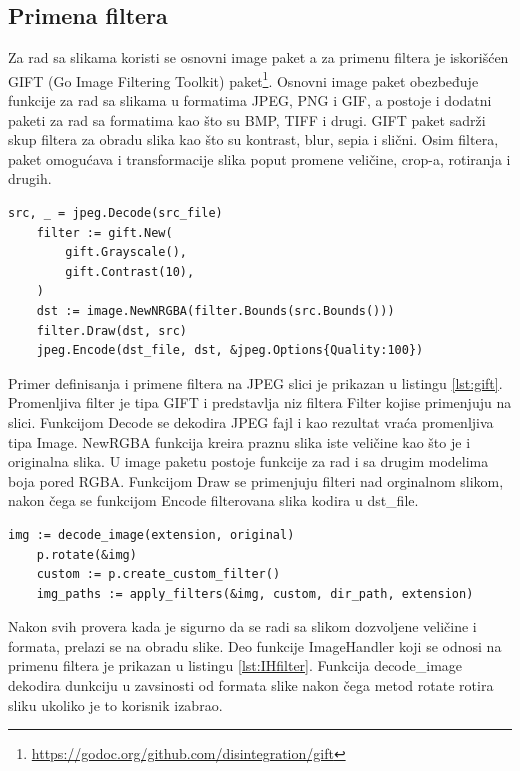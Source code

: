 \documentclass[12pt,oneside]{memoir}
\begin{document}
\subsection{Primena filtera}

Za rad sa slikama koristi se osnovni image paket a za primenu filtera je iskorišćen GIFT (Go Image Filtering Toolkit) paket\footnote{\url{https://godoc.org/github.com/disintegration/gift}}. Osnovni image paket obezbeđuje funkcije za rad sa slikama u formatima JPEG, PNG i GIF, a postoje i dodatni paketi za rad sa formatima kao što su BMP, TIFF i drugi. GIFT paket sadrži skup filtera za obradu slika kao što su kontrast, blur, sepia i slični. Osim filtera, paket omogućava i transformacije slika poput promene veličine, crop-a, rotiranja i drugih.

\begin{center}
\begin{lstlisting}[caption=Definisanje i primena filtera,label={lst:gift},  backgroundcolor=\color{background}]
	src, _ = jpeg.Decode(src_file)
	filter := gift.New(
		gift.Grayscale(),
		gift.Contrast(10),
	)
	dst := image.NewNRGBA(filter.Bounds(src.Bounds()))
	filter.Draw(dst, src)
	jpeg.Encode(dst_file, dst, &jpeg.Options{Quality:100})
\end{lstlisting}
\end{center}

Primer definisanja i primene filtera na JPEG slici je prikazan u listingu \ref{lst:gift}. Promenljiva filter je tipa GIFT i predstavlja niz filtera Filter kojise primenjuju na slici. Funkcijom Decode se dekodira JPEG fajl i kao rezultat vraća promenljiva tipa Image. NewRGBA funkcija kreira praznu slika iste veličine kao što je i originalna slika. U image paketu postoje funkcije za rad i sa drugim modelima boja pored RGBA. Funkcijom Draw se primenjuju filteri nad orginalnom slikom, nakon čega se funkcijom Encode filterovana slika kodira u dst\_file.

\begin{center}
\begin{lstlisting}[caption=Primena filtera u funkciji ImageHandler,label={lst:IHfilter},  backgroundcolor=\color{background}]
	img := decode_image(extension, original)
	p.rotate(&img)
	custom := p.create_custom_filter()
	img_paths := apply_filters(&img, custom, dir_path, extension)
\end{lstlisting}
\end{center}

Nakon svih provera kada je sigurno da se radi sa slikom dozvoljene veličine i formata, prelazi se na obradu slike. Deo funkcije ImageHandler koji se odnosi na primenu filtera je prikazan u listingu \ref{lst:IHfilter}. Funkcija decode\_image dekodira dunkciju u zavsinosti od formata slike nakon čega metod rotate rotira sliku ukoliko je to korisnik izabrao. 
\end{document}
